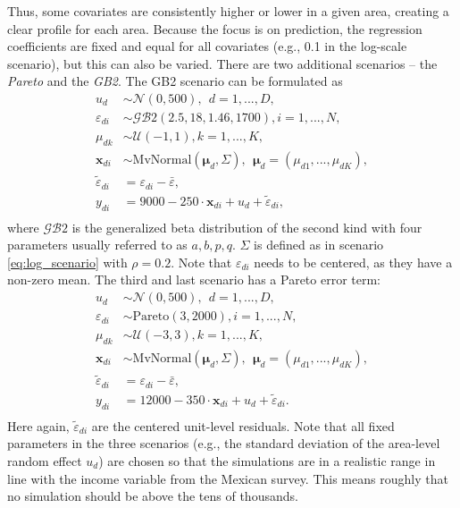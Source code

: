 Thus, some covariates are consistently higher or lower in a given area, creating a clear profile for each area.
Because the focus is on prediction, the regression coefficients are fixed and equal for all covariates (e.g., 0.1 in the log-scale scenario), but this can also be varied.
There are two additional scenarios – the \textit{Pareto} and the \textit{GB2}.
The GB2 scenario can be formulated as
\begin{equation}
    \begin{split}
        u_d & \sim \mathcal N(0, 500), ~~ d = 1,...,D,\\
        \varepsilon_{di} & \sim \mathcal{GB}2(2.5, 18, 1.46, 1700), i = 1,...,N,\\
        \mu_{dk} & \sim \mathcal{U}(-1, 1), k = 1,...,K,\\
        \boldsymbol x_{di}  &\sim \text{MvNormal} (\boldsymbol \mu_{d}, \Sigma) ,
        ~~ \boldsymbol \mu_{d} = (\mu_{d1}, ..., \mu_{dK}),\\
        \tilde{\varepsilon}_{di} & = \varepsilon_{di} - \bar \varepsilon,  \\
        y_{di} & = 9000 - 250 \cdot \boldsymbol x_{di} + u_d + \tilde \varepsilon_{di}, \\
    \end{split}
    \label{eq:gb2_scenario}
\end{equation}
where $\mathcal{GB}2$ is the generalized beta distribution of the second kind with four parameters usually referred to as $a, b, p, q$. $\Sigma$ is defined as in scenario \ref{eq:log_scenario} with $\rho = 0.2$. Note that $\varepsilon_{di}$ needs to be centered, as they have a non-zero mean. The third and last scenario has a Pareto error term:
\begin{equation}
    \begin{split}
        u_d & \sim \mathcal N(0, 500), ~~ d = 1,...,D,\\
        \varepsilon_{di} & \sim \text{Pareto}(3, 2000), i = 1,...,N,\\
        \mu_{dk} & \sim \mathcal{U}(-3, 3), k = 1,...,K,\\
        \boldsymbol x_{di}  &\sim \text{MvNormal} (\boldsymbol \mu_{d}, \Sigma) ,
        ~~ \boldsymbol \mu_{d} = (\mu_{d1}, ..., \mu_{dK}),\\
        \tilde{\varepsilon}_{di} & = \varepsilon_{di} - \bar \varepsilon,  \\
        y_{di} & = 12000 - 350 \cdot \boldsymbol x_{di}    + u_d + \tilde \varepsilon_{di}.\\
    \end{split}
    \label{eq:pareto_scenario}
\end{equation}
Here again, $\tilde \varepsilon_{di}$ are the centered unit-level residuals.
Note that all fixed parameters in the three scenarios (e.g., the standard deviation of the area-level random effect $u_d$) are chosen so that the simulations are in a realistic range in line with the income variable  from the Mexican survey.
This means roughly that no simulation should be above the tens of thousands.

